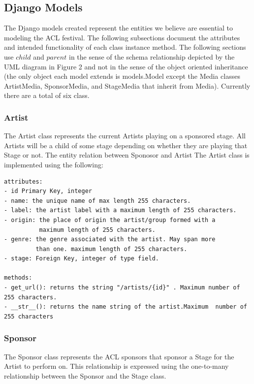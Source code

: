 \documentclass[12pt,english]{scrartcl}
\begin{document}
\subsection{Django Models}

The Django models created represent the entities we believe are essential to modeling the ACL festival.
The following subsections document the attributes and intended functionality of each class instance method. The following sections use
$child$ and $parent$ in the sense of the schema relationship depicted by the UML diagram in Figure 2 and not in the sense of the object oriented inheritance 
(the only object each model extends is models.Model except the Media classes ArtistMedia, SponsorMedia, and StageMedia that inherit from Media). Currently there are a total of six class.

\subsubsection{Artist}

The Artist class represents the current Artists playing on a sponsored stage. All Artists will be a child of some
stage depending on whether they are playing that Stage or not. The entity relation between Sponosor and Artist  The Artist class is implemented using the following:
\begin{verbatim}
attributes:
- id Primary Key, integer
- name: the unique name of max length 255 characters.
- label: the artist label with a maximum length of 255 characters.
- origin: the place of origin the artist/group formed with a 
          maximum length of 255 characters.
- genre: the genre associated with the artist. May span more 
         than one. maximum length of 255 characters.
- stage: Foreign Key, integer of type field.

methods:
- get_url(): returns the string "/artists/{id}" . Maximum number of 255 characters.
- __str__(): returns the name string of the artist.Maximum  number of 255 characters
\end{verbatim}


\subsubsection{Sponsor}

The Sponsor class represents the ACL sponsors that sponsor a Stage for the Artist to perform on.
This relationship is expressed using the one-to-many relationship between the Sponsor and the Stage
class. 
\end{document}
